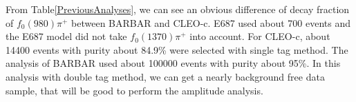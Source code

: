     From Table\ref{PreviousAnalyses}, we can see an obvious difference of decay fraction of $f_{0}(980)\pi^{+}$ between BARBAR and CLEO-c. E687 used about 700 events and the E687 model did not take $f_{0}(1370)\pi^{+}$ into account. For CLEO-c, about 14400 events with purity about 84.9\% were selected with single tag method. The analysis of BARBAR used about 100000 events with purity about 95\%. In this analysis with double tag method, we can get a nearly background free data sample, that will be good to perform the amplitude analysis.

